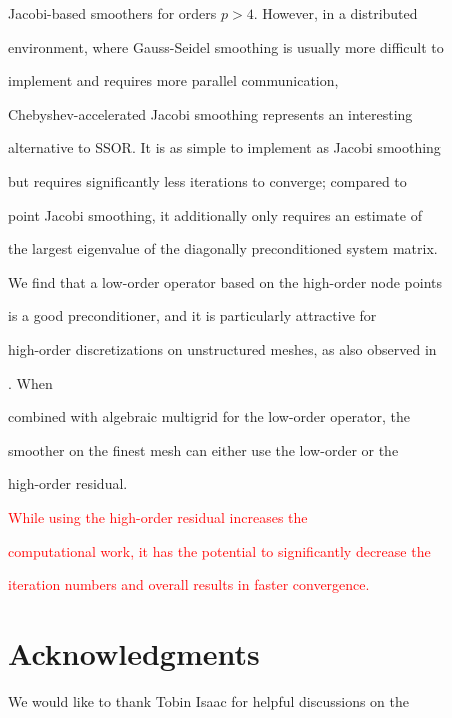 \documentclass[smallcondensed,final]{svjour3}     %
\newcommand{\todo}[1]{\textcolor{red}{ #1}}
\begin{document}
Jacobi-based smoothers for orders $p>4$. However, in a distributed

environment, where Gauss-Seidel smoothing is usually more difficult to

implement and requires more parallel communication,

Chebyshev-accelerated Jacobi smoothing represents an interesting

alternative to SSOR. It is as simple to implement as Jacobi smoothing

but requires significantly less iterations to converge; compared to

point Jacobi smoothing, it additionally only requires an estimate of

the largest eigenvalue of the diagonally preconditioned system matrix.





We find that a low-order operator based on the high-order node points

is a good preconditioner, and it is particularly attractive for

high-order discretizations on unstructured meshes, as also observed in

\cite{Brown10, DevilleMund90, HeysManteuffelMcCormickEtAl05}.  When

combined with algebraic multigrid for the low-order operator, the

smoother on the finest mesh can either use the low-order or the

high-order residual. \todo{While using the high-order residual increases the

computational work, it has the potential to significantly decrease the

iteration numbers and overall results in faster convergence.}










\section*{Acknowledgments}

We would like to thank Tobin Isaac for helpful discussions on the
\end{document}
